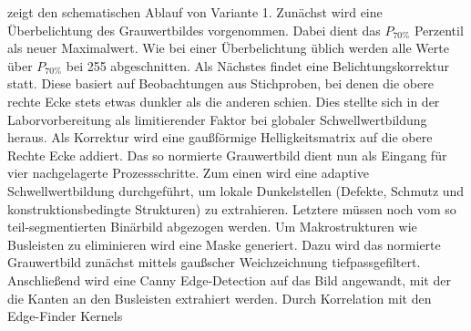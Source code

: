  zeigt den schematischen Ablauf von Variante 1. Zunächst wird eine Überbelichtung des Grauwertbildes vorgenommen. Dabei dient das \(P_{70\%}\) Perzentil als neuer Maximalwert. Wie bei einer Überbelichtung üblich werden alle Werte über \(P_{70\%}\) bei \num{255} abgeschnitten. Als Nächstes findet eine Belichtungskorrektur statt. Diese basiert auf Beobachtungen aus Stichproben, bei denen die obere rechte Ecke stets etwas dunkler als die anderen schien. Dies stellte sich in der Laborvorbereitung als limitierender Faktor bei globaler Schwellwertbildung heraus. Als Korrektur wird eine gaußförmige Helligkeitsmatrix auf die obere Rechte Ecke addiert. Das so normierte Grauwertbild dient nun als Eingang für vier nachgelagerte Prozessschritte. Zum einen wird eine adaptive Schwellwertbildung durchgeführt, um lokale Dunkelstellen (Defekte, Schmutz und konstruktionsbedingte Strukturen) zu extrahieren. Letztere müssen noch vom so teil-segmentierten Binärbild abgezogen werden. Um Makrostrukturen wie Busleisten zu eliminieren wird eine Maske generiert. Dazu wird das normierte Grauwertbild zunächst mittels gaußscher Weichzeichnung tiefpassgefiltert. Anschließend wird eine \foreignlanguage{english}{Canny Edge-Detection} auf das Bild angewandt, mit der die Kanten an den Busleisten extrahiert werden. Durch Korrelation mit den \foreignlanguage{english}{Edge-Finder} Kernels
%
